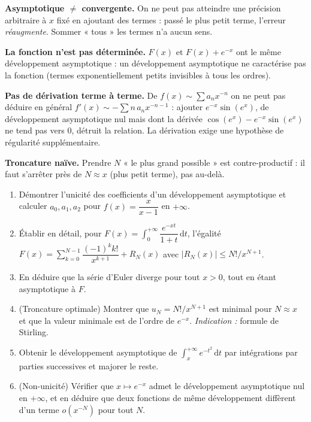 \begin{mdframed}[style=cexbar]
  \textbf{Asymptotique $\neq$ convergente.}\enspace%
  On ne peut pas atteindre une précision arbitraire à $x$ fixé en ajoutant des
  termes : passé le plus petit terme, l'erreur \emph{réaugmente}. Sommer
  « tous » les termes n'a aucun sens.

  \smallskip\noindent
  \textbf{La fonction n'est pas déterminée.}\enspace%
  $F(x)$ et $F(x)+e^{-x}$ ont le même développement asymptotique : un
  développement asymptotique ne caractérise pas la fonction (termes
  exponentiellement petits invisibles à tous les ordres).

  \smallskip\noindent
  \textbf{Pas de dérivation terme à terme.}\enspace%
  De $f(x)\sim\sum a_n x^{-n}$ on ne peut pas déduire en général
  $f'(x)\sim -\sum n\,a_n x^{-n-1}$ : ajouter $e^{-x}\sin(e^{x})$, de
  développement asymptotique nul mais dont la dérivée
  $\cos(e^{x})-e^{-x}\sin(e^{x})$ ne tend pas vers $0$, détruit la relation. La
  dérivation exige une hypothèse de régularité supplémentaire.

  \smallskip\noindent
  \textbf{Troncature naïve.}\enspace%
  Prendre $N$ « le plus grand possible » est contre-productif : il faut s'arrêter
  près de $N\approx x$ (plus petit terme), pas au-delà.
\end{mdframed}

\vspace{6pt}
\exolabel

\begin{mdframed}[style=exobar]
  \begin{enumerate}
    \item Démontrer l'unicité des coefficients d'un développement asymptotique et
          calculer $a_0,a_1,a_2$ pour $f(x)=\dfrac{x}{x-1}$ en $+\infty$.

    \item Établir en détail, pour $F(x)=\int_0^{+\infty}\dfrac{e^{-xt}}{1+t}\,
          \mathrm{d}t$, l'égalité
          $F(x)=\sum_{k=0}^{N-1}\dfrac{(-1)^k k!}{x^{k+1}}+R_N(x)$ avec
          $|R_N(x)|\leq N!/x^{N+1}$.

    \item En déduire que la série d'Euler diverge pour tout $x>0$, tout en étant
          asymptotique à $F$.

    \item (Troncature optimale) Montrer que $u_N=N!/x^{N+1}$ est minimal pour
          $N\approx x$ et que la valeur minimale est de l'ordre de $e^{-x}$.
          \textit{Indication :} formule de Stirling.

    \item Obtenir le développement asymptotique de $\displaystyle\int_x^{+\infty}
          e^{-t^2}\,\mathrm{d}t$ par intégrations par parties successives et
          majorer le reste.

    \item (Non-unicité) Vérifier que $x\mapsto e^{-x}$ admet le développement
          asymptotique nul en $+\infty$, et en déduire que deux fonctions de
          même développement diffèrent d'un terme $o(x^{-N})$ pour tout $N$.
  \end{enumerate}
\end{mdframed}

